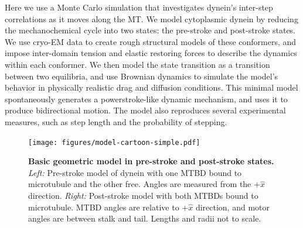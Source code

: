 \documentclass[9pt,twocolumn,twoside]{article}
\begin{document}
Here we use a Monte Carlo simulation that investigates dynein's inter-step correlations as it moves along the MT. We model cytoplasmic dynein by reducing the mechanochemical cycle into two states: the pre-stroke and post-stroke states. We use cryo-EM data to create rough structural models of these conformers, and impose inter-domain tension and elastic restoring forces to describe the dynamics within each conformer. We then model the state transition as a transition between two equilibria, and use Brownian dynamics to simulate the model's behavior in physically realistic drag and diffusion conditions. This minimal model spontaneously generates a powerstroke-like dynamic mechanism, and uses it to produce bidirectional motion. The model also reproduces several experimental measures, such as step length and the probability of stepping. 

\begin{figure}[tbhp]
\centering
\texttt{[image: figures/model-cartoon-simple.pdf]}
\caption{\textbf{Basic geometric model in pre-stroke and post-stroke states.} \textit{Left: } Pre-stroke model of dynein with one MTBD bound to microtubule and the other free. Angles are measured from the $+\hat{x}$ direction. \textit{Right: } Post-stroke model with both MTBDs bound to microtubule. MTBD angles are relative to $+\hat{x}$ direction, and motor angles are between stalk and tail. Lengths and radii not to scale.}
\label{fig:model}
\end{figure}
\end{document}
